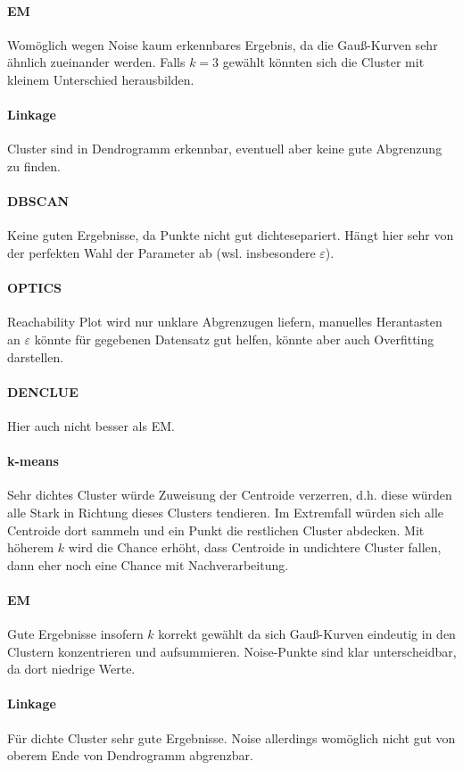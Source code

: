 \documentclass[10pt]{article} %
\begin{document}
\paragraph{EM} Womöglich wegen Noise kaum erkennbares Ergebnis, da die
Gauß-Kurven sehr ähnlich zueinander werden. Falls $k=3$ gewählt könnten sich die
Cluster mit kleinem Unterschied herausbilden.
\paragraph{Linkage} Cluster sind in Dendrogramm erkennbar, eventuell aber keine
gute Abgrenzung zu finden.
\paragraph{DBSCAN} Keine guten Ergebnisse, da Punkte nicht gut dichtesepariert.
Hängt hier sehr von der perfekten Wahl der Parameter ab (wsl. insbesondere
$\varepsilon$).
\paragraph{OPTICS} Reachability Plot wird nur unklare Abgrenzugen liefern,
manuelles Herantasten an $\varepsilon$ könnte für gegebenen Datensatz gut
helfen, könnte aber auch Overfitting darstellen.
\paragraph{DENCLUE} Hier auch nicht besser als EM.

\newpage

\paragraph{k-means} Sehr dichtes Cluster würde Zuweisung der Centroide
verzerren, d.h. diese würden alle Stark in Richtung dieses Clusters tendieren.
Im Extremfall würden sich alle Centroide dort sammeln und ein Punkt die
restlichen Cluster abdecken. Mit höherem $k$ wird die Chance erhöht, dass
Centroide in undichtere Cluster fallen, dann eher noch eine Chance mit
Nachverarbeitung.
\paragraph{EM} Gute Ergebnisse insofern $k$ korrekt gewählt da sich Gauß-Kurven
eindeutig in den Clustern konzentrieren und aufsummieren. Noise-Punkte sind klar
unterscheidbar, da dort niedrige Werte.
\paragraph{Linkage} Für dichte Cluster sehr gute Ergebnisse. Noise allerdings
womöglich nicht gut von oberem Ende von Dendrogramm abgrenzbar.
\end{document}
